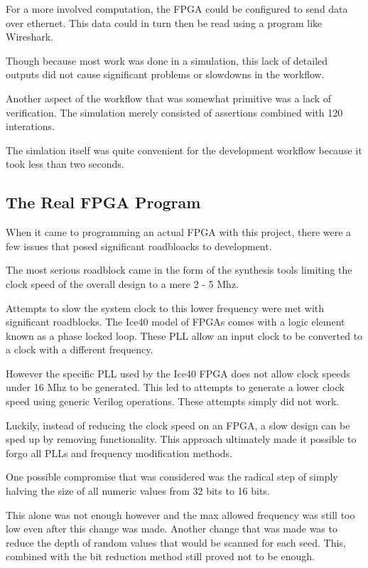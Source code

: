 \documentclass{article}
\begin{document}
    For a more involved computation, the FPGA could be configured to
    send data over ethernet. This data could in turn then be read
    using a program like Wireshark.

    Though because most work was done in a simulation, this lack of detailed
    outputs did not cause significant problems or slowdowns in the workflow.

    Another aspect of the workflow that was somewhat primitive was a lack
    of verification. The simulation merely consisted of assertions combined
    with 120 interations.

    The simlation itself was quite convenient for the development workflow
    because it took less than two seconds.

    \subsection{The Real FPGA Program}

    When it came to programming an actual FPGA with this project,
    there were a few issues that posed significant roadbloacks to development.

    The most serious roadblock came in the form of the synthesis tools
    limiting the clock speed of the overall design to a mere 2 - 5 Mhz.

    Attempts to slow the system clock to this lower frequency were
    met with significant roadblocks.
    The Ice40 model of FPGAs comes with a logic element known as
    a phase locked loop. These PLL allow an input clock to be converted
    to a clock with a different frequency.

    However the specific PLL used by the Ice40 FPGA does not allow clock speeds
    under 16 Mhz to be generated.
    This led to attempts to generate a lower clock speed using generic Verilog operations.
    These attempts simply did not work.

    Luckily, instead of reducing the clock speed on an FPGA, a slow design
    can be sped up by removing functionality.
    This approach ultimately made it possible to forgo all PLLs and
    frequency modification methods.

    One possible compromise that was considered was the radical step
    of simply halving the size of all numeric values from 32 bits to 16
    bits.

    This alone was not enough however and the max allowed frequency was still
    too low even after this change was made.
    Another change that was made was to reduce the depth of random values
    that would be scanned for each seed.
    This, combined with the bit reduction method still proved not to be enough.
\end{document}
